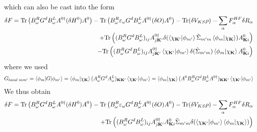 \documentclass[aps,prb,floatfix,epsfig,singlecolumn,showpacs,preprintnumbers]{revtex4}
\newcommand{\vK}{{\mathbf{K}}}
\newcommand{\Tr}{\mathrm{Tr}}
\begin{document}
which can also be cast into the form
\begin{eqnarray}
\delta F = 
\Tr\left( B^R_\omega G^d B^L_\omega A^{0\dagger}(\delta  H^0)A^0 \right)
-\Tr\left(B^R_\omega\varepsilon_\omega G^d B^L_\omega A^{0\dagger}(\delta  O) A^0 \right) 
- \Tr(\delta V_{KS}\rho) -\sum_\alpha F^{HF}_\alpha \delta R_\alpha 
\\
+\Tr\left( (B^R_\omega G^d B^L_\omega)_{ij}
  A^{0\dagger}_{j\vK'}\delta(\braket{\chi_{\vK'}|\phi_{m'}}\tilde{\Sigma}_{m'm}\braket{\phi_{m}|\chi_\vK})A^0_{\vK i}\right)\\
-\Tr\left( (B^R_\omega G^d B^L_\omega)_{ij}
  A^{0\dagger}_{ j\vK'} \braket{\chi_{\vK'}|\phi_{m'}}\delta(\tilde{\Sigma}_{m'm})\braket{\phi_{m}|\chi_\vK}A^0_{\vK i}\right)
\end{eqnarray}
where we used
\begin{eqnarray}
G_{local\; mm'} = \braket{\phi_m|G|\phi_{m'}}=
\braket{\phi_m|\chi_{\vK}}(A^R_\omega G^d A^L_\omega )_{\vK\vK'}\braket{\chi_{\vK'}|\phi_{m'}} = 
\braket{\phi_m|\chi_{\vK}}(A^0 B^R_\omega  G^d B^L_\omega A^{0\dagger})_{\vK\vK'}\braket{\chi_{\vK'}|\phi_{m'}} 
\end{eqnarray}
We thus obtain
\begin{eqnarray}
\delta F = 
\Tr\left( B^R_\omega G^d B^L_\omega A^{0\dagger}(\delta  H^0)A^0 \right)
-\Tr\left(B^R_\omega\varepsilon_\omega G^d B^L_\omega A^{0\dagger}(\delta  O) A^0 \right) 
- \Tr(\delta V_{KS}\rho) -\sum_\alpha F^{HF}_\alpha \delta R_\alpha 
\\
+\Tr\left( (B^R_\omega G^d B^L_\omega)_{ij}
  A^{0\dagger}_{j\vK'}A^0_{\vK i}
\tilde{\Sigma}_{m'm}
\delta(\braket{\chi_{\vK'}|\phi_{m'}}\braket{\phi_{m}|\chi_\vK})\right)
\end{eqnarray}
\end{document}
